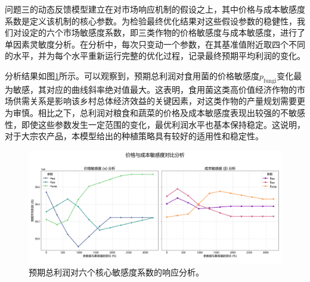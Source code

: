 问题三的动态反馈模型建立在对市场响应机制的假设之上，其中价格与成本敏感度系数是定义该机制的核心参数。为检验最终优化结果对这些假设参数的稳健性，我们对设定的六个市场敏感度系数，即三类作物的价格敏感度与成本敏感度，进行了单因素灵敏度分析。在分析中，每次只变动一个参数，在其基准值附近取四个不同的水平，并为每个水平重新运行完整的优化过程，记录最终预期平均利润的变化。

分析结果如图\ref{fig:market_sensitivity}所示。可以观察到，预期总利润对食用菌的价格敏感度$p_{\text{fungi}}$变化最为敏感，其对应的曲线斜率绝对值最大。这表明，食用菌这类高价值经济作物的市场供需关系是影响该乡村总体经济效益的关键因素，对这类作物的产量规划需要更为审慎。相比之下，总利润对粮食和蔬菜的价格及成本敏感度表现出较强的不敏感性，即使这些参数发生一定范围的变化，最优利润水平也基本保持稳定。这说明，对于大宗农产品，本模型给出的种植策略具有较好的适用性和稳定性。

\begin{figure}[H]
    \centering
    \includegraphics[width=\textwidth]{figs/6灵敏度分析/问题三灵敏度分析图.png}
    \caption{预期总利润对六个核心敏感度系数的响应分析。}
    \label{fig:market_sensitivity}
\end{figure}
